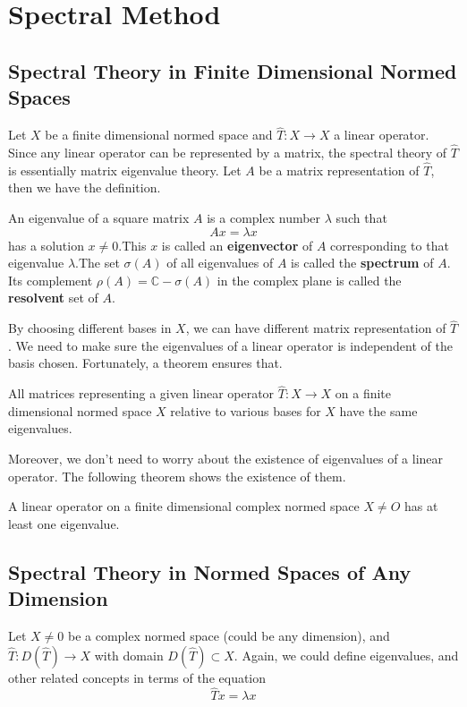 \chapter{Spectral Method} \label{chap:spectral-method}
\section{Spectral Theory in Finite Dimensional Normed Spaces}
Let $X$ be a finite dimensional normed space and $\hat{T}: X \to X$ a linear operator. Since any linear operator can be represented by a matrix, the spectral theory of $\hat{T}$ is essentially matrix eigenvalue theory. \cite{kreyszig_introductory_1978} Let $A$ be a matrix representation of $\hat{T}$, then we have the definition.

\begin{definition}
	An eigenvalue of a square matrix $A$ is a complex number $\lambda$ such that
	\[ Ax = \lambda x \]
	has a solution $x\neq 0$.This $x$ is called an \textbf{eigenvector} of $A$ corresponding to that eigenvalue $\lambda$.The set $\sigma(A)$ of all eigenvalues of $A$ is called the \textbf{spectrum} of $A$. Its complement $\rho(A) = \mathbb{C}-\sigma(A)$ in the complex plane is called the \textbf{resolvent} set of $A$.
\end{definition}

By choosing different bases in $X$, we can have different matrix representation of $\hat{T}$. We need to make sure the eigenvalues of a linear operator is independent of the basis chosen. Fortunately, a theorem ensures that.

\begin{theorem}
	All matrices representing a given linear operator $\hat{T}: X \to X$ on a finite dimensional normed space $X$ relative to various bases for $X$ have the same eigenvalues.
\end{theorem}


Moreover, we don't need to worry about the existence of eigenvalues of a linear operator. The following theorem shows the existence of them.
\begin{theorem}
	A linear operator on a finite dimensional complex normed space $X\neq{O}$ has at least one eigenvalue.
\end{theorem}


\section{Spectral Theory in Normed Spaces of Any Dimension}
Let $X\neq {0}$ be a complex normed space (could be any dimension), and $\hat{T}: D(\hat{T}) \to X$ with domain $D(\hat{T}) \subset X$. Again, we could define eigenvalues, and other related concepts in terms of the equation
\[ \hat{T}x = \lambda x \]

